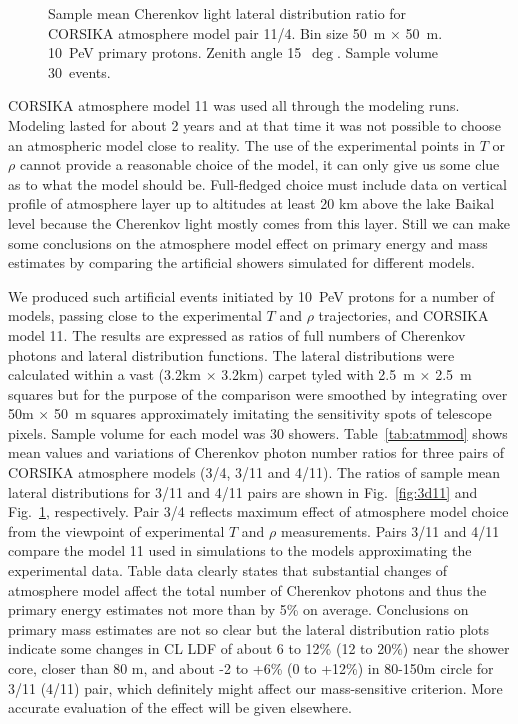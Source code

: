 \documentclass[final,5p,times,twocolumn]{elsarticle}
\begin{document}
\begin{figure}[tb]
\begin{minipage}[t]{0.48\textwidth}
    \vspace{-1.0pc}
    \caption{Sample mean Cherenkov light lateral distribution ratio for CORSIKA atmosphere model
    pair 11/4. Bin size 50~m $\times$ 50~m. 10~PeV primary protons. Zenith angle 15~$\deg$. Sample volume 30~events.}
\label{fig:4d11}
\end{minipage}
\end{figure}


CORSIKA atmosphere model 11 was used all through the modeling runs. Modeling lasted for about 2 years and at that time it was not possible to choose an atmospheric model close to reality.
The use of the experimental points in $T$ or $\rho$ cannot provide a reasonable  choice of the model, it can only give us some clue as to what the model should be. Full-fledged choice must
include data on vertical profile of atmosphere layer up to altitudes at least 20 km above the lake Baikal level because the Cherenkov light mostly comes from this layer. Still we can make some
conclusions on the atmosphere model effect on primary energy and mass estimates by comparing the artificial showers simulated for different models.

We produced such artificial events initiated by 10~PeV protons for a number of models,  passing close to the experimental $T$ and $\rho$ trajectories, and CORSIKA model 11. The results are expressed as ratios of full numbers of Cherenkov photons and lateral distribution functions.
The lateral distributions were calculated within a vast (3.2km $\times$ 3.2km) carpet tyled with 2.5~m $\times$ 2.5~m squares but for the purpose of the comparison were smoothed by integrating over 50m $\times$ 50~m squares approximately imitating the sensitivity spots of telescope pixels.
Sample volume for each model was 30 showers. Table~\ref{tab:atmmod} shows mean values and variations of Cherenkov photon number ratios for three pairs of CORSIKA atmosphere models (3/4, 3/11 and 4/11). The ratios of sample mean lateral distributions for 3/11 and 4/11 pairs are shown in Fig.~\ref{fig:3d11} and Fig.~\ref{fig:4d11}, respectively. Pair 3/4 reflects maximum effect of atmosphere model choice from the viewpoint of experimental $T$ and $\rho$ measurements. Pairs 3/11 and 4/11 compare the model 11 used in simulations to the models approximating the experimental data.
Table data clearly states that substantial changes of atmosphere model affect the total number of Cherenkov photons and thus the primary energy estimates not more than by 5\% on average. Conclusions on primary mass estimates are not so clear but the lateral distribution ratio plots indicate some changes in CL LDF of about 6 to 12\% (12 to 20\%) near the shower core, closer than 80 m, and about -2 to +6\% (0 to +12\%) in 80-150m circle for 3/11 (4/11) pair, which definitely might affect our mass-sensitive criterion. More accurate evaluation of the effect will be given elsewhere.
\end{document}
